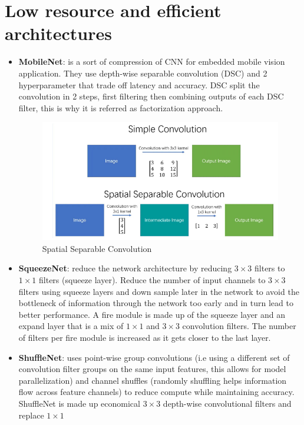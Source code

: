 \section{Low resource and efficient architectures}
\begin{itemize}
    \item \textbf{MobileNet}: is a sort of compression of CNN for embedded mobile
          vision application. They use depth-wise separable convolution (DSC) and
          2 hyperparameter that trade off latency and accuracy. DSC split the
          convolution in 2 steps, first filtering then combining outputs of each
          DSC filter, this is why it is referred as factorization approach.
          \begin{figure}[!ht]
              \centering
              \includegraphics[width=0.5\linewidth]{img/CNN/spatialConv.png}
              \caption{Spatial Separable Convolution}
              \label{fig:spatialConv}
          \end{figure}
    \item \textbf{SqueezeNet}: reduce the network architecture by reducing $3 \times 3$
          filters to $1\times1$ filters (squeeze layer). Reduce the number of
          input channels to $3 \times 3$ filters using squeeze layers and down
          sample later in the network to avoid the bottleneck of information
          through the network too early and in turn lead to better performance.
          A fire module is made up of the squeeze layer and an expand layer that
          is a mix of $1 \times 1$ and $3 \times 3$ convolution filters. The number
          of filters per fire module is increased as it gets closer to the
          last layer.
    \item \textbf{ShuffleNet}: uses point-wise group convolutions (i.e using a
          different set of convolution filter groups on the same input features,
          this allows for model parallelization) and channel shuffles (randomly
          shuffling helps information flow across feature channels) to reduce
          compute while maintaining accuracy. ShuffleNet is made up economical
          $3 \times 3$ depth-wise convolutional filters and replace $1 \times 1$

\end{itemize}
